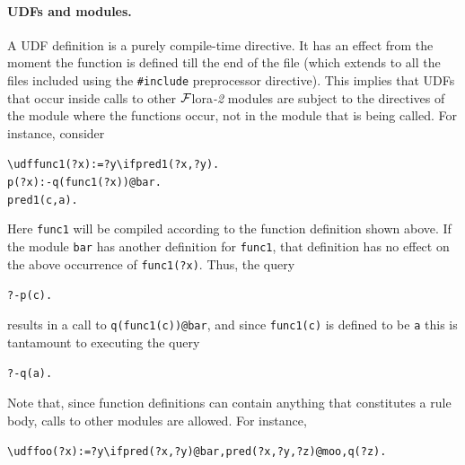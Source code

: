\documentclass[11pt]{article}
\newcommand{\FLORA}{{\mbox{\sc ${\cal F}${lora}\rm\emph{-2}}}\xspace}
\newcommand{\FLSYSTEM}{\FLORA}
\newcommand{\bs}{\textbackslash}
\begin{document}
\paragraph{UDFs and modules.}
A UDF definition is a purely compile-time directive. It has an effect from
the moment the function is defined till the end of the file (which extends to
all the files included using the \texttt{\#include} preprocessor
directive). This implies that UDFs that occur inside calls to other \FLSYSTEM
modules are subject to the directives of the module where the functions
occur, not in the module that is being called. For instance, consider
\begin{alltt}
    \bs{}udf func1(?x) := ?y \bs{}if pred1(?x,?y).
    p(?x) :- q(func1(?x))@bar.
    pred1(c,a).
\end{alltt}
Here \texttt{func1} will be compiled according to the function definition
shown above. If the module \texttt{bar} has another definition for
\texttt{func1}, that definition has no effect on the above occurrence of
\texttt{func1(?x)}.   Thus, the query
\begin{alltt}
?- p(c).
\end{alltt}
results in a call to \texttt{q(func1(c))@bar}, and since \texttt{func1(c)} is
defined to be \texttt{a} this is tantamount to executing the query  
\begin{alltt}
?- q(a).
\end{alltt}
Note that, since function definitions can contain anything that constitutes
a rule body, calls to other modules are allowed. For instance, 
\begin{alltt}
    \bs{}udf foo(?x):=?y \bs{}if pred(?x,?y)@bar, pred(?x,?y,?z)@moo, q(?z).
\end{alltt}
\end{document}
